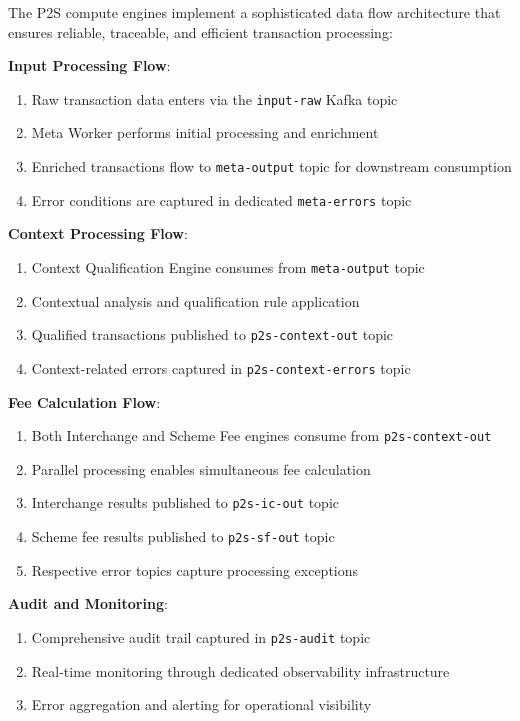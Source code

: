 The P2S compute engines implement a sophisticated data flow architecture that ensures reliable, traceable, and efficient transaction processing:

\textbf{Input Processing Flow}:
\begin{enumerate}
    \item Raw transaction data enters via the \texttt{input-raw} Kafka topic
    \item Meta Worker performs initial processing and enrichment
    \item Enriched transactions flow to \texttt{meta-output} topic for downstream consumption
    \item Error conditions are captured in dedicated \texttt{meta-errors} topic
\end{enumerate}

\textbf{Context Processing Flow}:
\begin{enumerate}
    \item Context Qualification Engine consumes from \texttt{meta-output} topic
    \item Contextual analysis and qualification rule application
    \item Qualified transactions published to \texttt{p2s-context-out} topic
    \item Context-related errors captured in \texttt{p2s-context-errors} topic
\end{enumerate}

\textbf{Fee Calculation Flow}:
\begin{enumerate}
    \item Both Interchange and Scheme Fee engines consume from \texttt{p2s-context-out}
    \item Parallel processing enables simultaneous fee calculation
    \item Interchange results published to \texttt{p2s-ic-out} topic
    \item Scheme fee results published to \texttt{p2s-sf-out} topic
    \item Respective error topics capture processing exceptions
\end{enumerate}

\textbf{Audit and Monitoring}:
\begin{enumerate}
    \item Comprehensive audit trail captured in \texttt{p2s-audit} topic
    \item Real-time monitoring through dedicated observability infrastructure
    \item Error aggregation and alerting for operational visibility
\end{enumerate}

